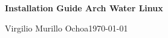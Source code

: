 \begin{center}

	\huge\textbf{
		Installation Guide Arch Water Linux
	}\linebreak[4]

	Virgilio Murillo Ochoa\linebreak[4]
	\today\linebreak[4]

\end{center}
